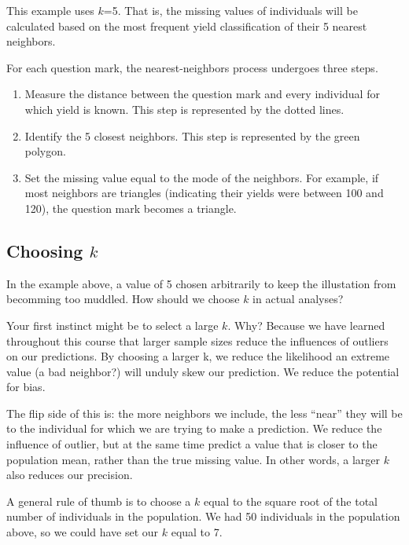 \documentclass[
]{book}
\providecommand{\tightlist}{%
  \setlength{\itemsep}{0pt}\setlength{\parskip}{0pt}}
\begin{document}
This example uses \(k\)=5. That is, the missing values of individuals will be calculated based on the most frequent yield classification of their 5 nearest neighbors.

For each question mark, the nearest-neighbors process undergoes three steps.

\begin{enumerate}
\def\labelenumi{\arabic{enumi})}
\tightlist
\item
  Measure the distance between the question mark and every individual for which yield is known. This step is represented by the dotted lines.
\item
  Identify the 5 closest neighbors. This step is represented by the green polygon.
\item
  Set the missing value equal to the mode of the neighbors. For example, if most neighbors are triangles (indicating their yields were between 100 and 120), the question mark becomes a triangle.
\end{enumerate}

\hypertarget{choosing-k}{%
\subsection{\texorpdfstring{Choosing \(k\)}{Choosing k}}\label{choosing-k}}

In the example above, a value of 5 chosen arbitrarily to keep the illustation from becomming too muddled. How should we choose \(k\) in actual analyses?

Your first instinct might be to select a large \(k\). Why? Because we have learned throughout this course that larger sample sizes reduce the influences of outliers on our predictions. By choosing a larger k, we reduce the likelihood an extreme value (a bad neighbor?) will unduly skew our prediction. We reduce the potential for bias.

The flip side of this is: the more neighbors we include, the less ``near'' they will be to the individual for which we are trying to make a prediction. We reduce the influence of outlier, but at the same time predict a value that is closer to the population mean, rather than the true missing value. In other words, a larger \(k\) also reduces our precision.

A general rule of thumb is to choose a \(k\) equal to the square root of the total number of individuals in the population. We had 50 individuals in the population above, so we could have set our \(k\) equal to 7.
\end{document}
